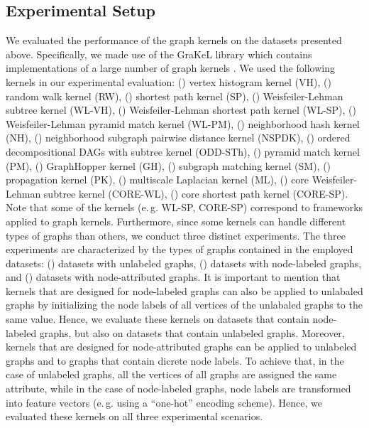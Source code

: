 \documentclass[twoside,11pt]{article}
\newcommand{\eg}{e.\,g. }
\begin{document}
\subsection{Experimental Setup}
We evaluated the performance of the graph kernels on the datasets presented above. 
Specifically, we made use of the GraKeL library which contains implementations of a large number of graph kernels \cite{siglidis2018grakel}.
We used the following  kernels in our experimental evaluation: () vertex histogram kernel (VH), () random walk kernel (RW), () shortest path kernel (SP), () Weisfeiler-Lehman subtree kernel (WL-VH), () Weisfeiler-Lehman shortest path kernel (WL-SP), () Weisfeiler-Lehman pyramid match kernel (WL-PM), () neighborhood hash kernel (NH), () neighborhood subgraph pairwise distance kernel (NSPDK), () ordered decompositional DAGs with subtree kernel (ODD-STh), () pyramid match kernel (PM), () GraphHopper kernel (GH), () subgraph matching kernel (SM), () propagation kernel (PK), () multiscale Laplacian kernel (ML), () core Weisfeiler-Lehman subtree kernel (CORE-WL), () core shortest path kernel (CORE-SP).
Note that some of the kernels (\eg WL-SP, CORE-SP) correspond to frameworks applied to graph kernels.
Furthermore, since some kernels can handle different types of graphs than others, we conduct three distinct experiments.
The three experiments are characterized by the types of graphs contained in the employed datasets: () datasets with unlabeled graphs, () datasets with node-labeled graphs, and () datasets with node-attributed graphs.
It is important to mention that kernels that are designed for node-labeled graphs can also be applied to unlabaled graphs by initializing the node labels of all vertices of the unlabaled graphs to the same value.
Hence, we evaluate these kernels on datasets that contain node-labeled graphs, but also on datasets that contain unlabeled graphs.
Moreover, kernels that are designed for node-attributed graphs can be applied to unlabeled graphs and to graphs that contain dicrete node labels.
To achieve that, in the case of unlabeled graphs, all the vertices of all graphs are assigned the same attribute, while in the case of node-labeled graphs, node labels are transformed into feature vectors (\eg using a ``one-hot'' encoding scheme).
Hence, we evaluated these kernels on all three experimental scenarios.
\end{document}
